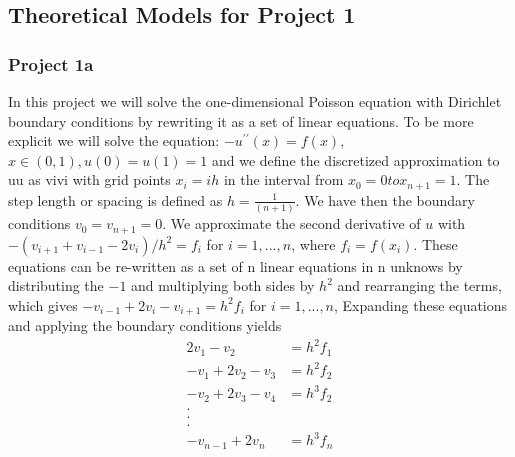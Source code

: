 \documentclass[11pt, oneside]{article}   	%
\begin{document}
\subsection{Theoretical Models for Project 1}
\subsubsection{Project 1a}
In this project we will solve the one-dimensional Poisson equation with Dirichlet boundary conditions by rewriting it as a set of linear equations.
To be more explicit we will solve the equation:\newline
\newline
$-u^{\prime\prime} (x)=f(x)$, $x \in (0,1), u(0) = u(1) = 1$\newline
\newline
and we define the discretized approximation to uu as vivi with grid points $x_i=ih$ in the interval from $x_0=0 to x_{n+1}=1$. The step length or spacing is defined as $h=\frac{1}{(n+1)}$. We have then the boundary conditions $v_0=v_{n+1}=0$. We approximate the second derivative of $u$ with\newline
\newline
$-(v_{i+1} + v_{i-1} - 2v_i)/{h^2} = f_i$ for $i = 1,...,n$,\newline
\newline
where $f_i=f(x_i)$.\newline
These equations can be re-written as a set of n linear equations in n unknows by distributing the $-1$ and multiplying both sides by $h^2$ and rearranging the terms, which gives\newline
\newline
$-v_{i-1} + 2v_i  - v_{i+1}=h^2 f_i$ for $i = 1,...,n$,\newline
\newline
Expanding these equations and applying the boundary conditions yields\newline
\newline
\begin{align*}
2v_1 - v_2 &= h^2 f_1 \\
-v_1 + 2v_2 - v_3 &= h^2f_2\\
-v_2 + 2v_3 - v_4 &= h^3f_2\\.\\.\\.\\
-v_{n-1} + 2v_n &= h^3f_n
\end{align*}\newline
\newline
\end{document}
